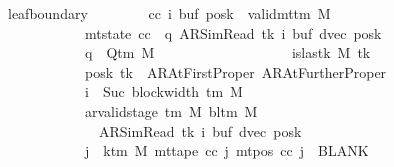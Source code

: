 \begin{isabellebody}
\ \ \ \ \ \ \ leaf{\isacharunderscore}{\kern0pt}boundary{\isacharcolon}{\kern0pt}\isanewline
\ \ \ \ \ \ \ \ {\isachardoublequoteopen}{\isasymAnd}cc\ i\ buf{\isacharprime}{\kern0pt}\ posk{\isacharprime}{\kern0pt}{\isachardot}{\kern0pt}\ {\isasymlbrakk}\ valid{\isacharunderscore}{\kern0pt}mttm\ M{\isacharsemicolon}{\kern0pt}\isanewline
\ \ \ \ \ \ \ \ \ \ \ \ \ \ \ \ \ \ mt{\isacharunderscore}{\kern0pt}state\ cc\ {\isacharequal}{\kern0pt}\ {\isacharparenleft}{\kern0pt}q{\isacharcomma}{\kern0pt}\ AR{\isacharunderscore}{\kern0pt}SimRead{\isacharcomma}{\kern0pt}\ tk{\isacharcomma}{\kern0pt}\ i{\isacharcomma}{\kern0pt}\ buf{\isacharprime}{\kern0pt}{\isacharcomma}{\kern0pt}\ dvec{\isacharcomma}{\kern0pt}\ posk{\isacharprime}{\kern0pt}{\isacharparenright}{\kern0pt}{\isacharsemicolon}{\kern0pt}\isanewline
\ \ \ \ \ \ \ \ \ \ \ \ \ \ \ \ \ \ q\ {\isasymin}\ Q{\isacharunderscore}{\kern0pt}tm\ M{\isacharsemicolon}{\kern0pt}\isanewline
\ \ \ \ \ \ \ \ \ \ \ \ \ \ \ \ \ \ {\isasymnot}\ is{\isacharunderscore}{\kern0pt}last{\isacharunderscore}{\kern0pt}k\ M\ tk{\isacharsemicolon}{\kern0pt}\isanewline
\ \ \ \ \ \ \ \ \ \ \ \ \ \ \ \ \ \ posk{\isacharprime}{\kern0pt}\ tk\ {\isasymin}\ {\isacharbraceleft}{\kern0pt}AR{\isacharunderscore}{\kern0pt}AtFirstProper{\isacharcomma}{\kern0pt}\ AR{\isacharunderscore}{\kern0pt}AtFurtherProper{\isacharbraceright}{\kern0pt}{\isacharsemicolon}{\kern0pt}\isanewline
\ \ \ \ \ \ \ \ \ \ \ \ \ \ \ \ \ \ i\ {\isacharequal}{\kern0pt}\ Suc\ {\isacharparenleft}{\kern0pt}block{\isacharunderscore}{\kern0pt}width\ {\isacharparenleft}{\kern0pt}{\isasymGamma}{\isacharunderscore}{\kern0pt}tm\ M{\isacharparenright}{\kern0pt}{\isacharparenright}{\kern0pt}{\isacharsemicolon}{\kern0pt}\isanewline
\ \ \ \ \ \ \ \ \ \ \ \ \ \ \ \ \ \ ar{\isacharunderscore}{\kern0pt}valid{\isacharunderscore}{\kern0pt}stage\ {\isacharparenleft}{\kern0pt}{\isasymGamma}{\isacharunderscore}{\kern0pt}tm\ M{\isacharparenright}{\kern0pt}\ {\isacharparenleft}{\kern0pt}bl{\isacharunderscore}{\kern0pt}tm\ M{\isacharparenright}{\kern0pt}\isanewline
\ \ \ \ \ \ \ \ \ \ \ \ \ \ \ \ \ \ \ \ {\isacharparenleft}{\kern0pt}AR{\isacharunderscore}{\kern0pt}SimRead{\isacharcomma}{\kern0pt}\ tk{\isacharcomma}{\kern0pt}\ i{\isacharcomma}{\kern0pt}\ buf{\isacharprime}{\kern0pt}{\isacharcomma}{\kern0pt}\ dvec{\isacharcomma}{\kern0pt}\ posk{\isacharprime}{\kern0pt}{\isacharparenright}{\kern0pt}{\isacharsemicolon}{\kern0pt}\isanewline
\ \ \ \ \ \ \ \ \ \ \ \ \ \ \ \ \ \ {\isasymforall}j\ {\isasymge}\ k{\isacharunderscore}{\kern0pt}tm\ M{\isachardot}{\kern0pt}\ mt{\isacharunderscore}{\kern0pt}tape\ cc\ j\ {\isacharparenleft}{\kern0pt}mt{\isacharunderscore}{\kern0pt}pos\ cc\ j{\isacharparenright}{\kern0pt}\ {\isacharequal}{\kern0pt}\ BLANK{}{\isacharsemicolon}{\kern0pt}\isanewline

\end{isabellebody}
